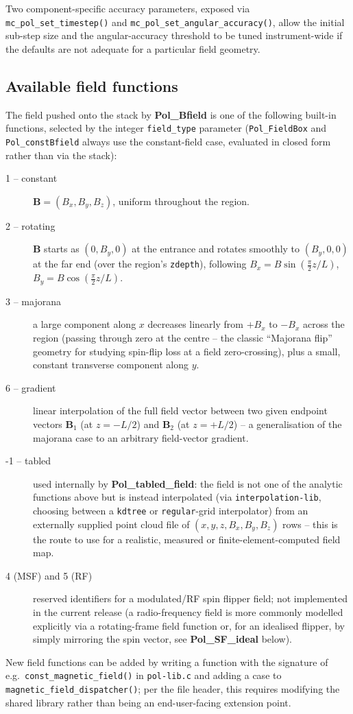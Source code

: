 Two component-specific accuracy parameters, exposed via
\texttt{mc\_pol\_set\_timestep()} and \texttt{mc\_pol\_set\_angular\_accuracy()},
allow the initial sub-step size and the angular-accuracy threshold to be
tuned instrument-wide if the defaults are not adequate for a particular
field geometry.

\subsection{Available field functions}
\label{sec:fieldfuncs}

The field pushed onto the stack by \textbf{Pol\_Bfield} is one of the
following built-in functions, selected by the integer \texttt{field\_type}
parameter (\texttt{Pol\_FieldBox} and \texttt{Pol\_constBfield} always use
the constant-field case, evaluated in closed form rather than via the
stack):

\begin{description}
\item[1 -- constant] $\mathbf{B}=(B_x,B_y,B_z)$, uniform throughout the
  region.
\item[2 -- rotating] $\mathbf{B}$ starts as $(0,B_y,0)$ at the entrance and
  rotates smoothly to $(B_y,0,0)$ at the far end (over the region's
  \texttt{zdepth}), following $B_x = B\sin(\tfrac{\pi}{2}z/L)$, $B_y =
  B\cos(\tfrac{\pi}{2}z/L)$.
\item[3 -- majorana] a large component along $x$ decreases linearly from
  $+B_x$ to $-B_x$ across the region (passing through zero at the centre --
  the classic ``Majorana flip'' geometry for studying spin-flip loss at a
  field zero-crossing), plus a small, constant transverse component along
  $y$.
\item[6 -- gradient] linear interpolation of the full field vector between
  two given endpoint vectors $\mathbf{B}_1$ (at $z=-L/2$) and
  $\mathbf{B}_2$ (at $z=+L/2$) -- a generalisation of the majorana case to
  an arbitrary field-vector gradient.
\item[-1 -- tabled] used internally by \textbf{Pol\_tabled\_field}: the
  field is not one of the analytic functions above but is instead
  interpolated (via \texttt{interpolation-lib}, choosing between a
  \texttt{kdtree} or \texttt{regular}-grid interpolator) from an externally
  supplied point cloud file of $(x,y,z,B_x,B_y,B_z)$ rows -- this is the
  route to use for a realistic, measured or finite-element-computed field
  map.
\item[4 (MSF) and 5 (RF)] reserved identifiers for a modulated/RF spin
  flipper field; not implemented in the current release (a radio-frequency
  field is more commonly modelled explicitly via a rotating-frame field
  function or, for an idealised flipper, by simply mirroring the spin
  vector, see \textbf{Pol\_SF\_ideal} below).
\end{description}
New field functions can be added by writing a function with the signature
of e.g.\ \texttt{const\_magnetic\_field()} in \texttt{pol-lib.c} and adding
a case to \texttt{magnetic\_field\_dispatcher()}; per the file header, this
requires modifying the shared library rather than being an
end-user-facing extension point.

